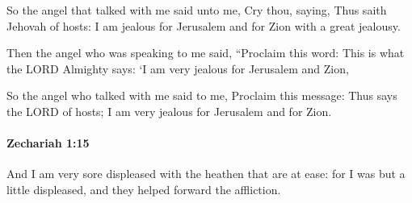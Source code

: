 			\begin{versebox}
					\item[BHS] 
					\item[LXX] 
					\item[ASV] So the angel that talked with me said unto me, Cry thou, saying, Thus saith Jehovah of hosts: I am jealous for Jerusalem and for Zion with a great jealousy.
					\item[NIV] Then the angel who was speaking to me said, “Proclaim this word: This is what the LORD Almighty says: ‘I am very jealous for Jerusalem and Zion,
					\item[NRSV] So the angel who talked with me said to me, Proclaim this message: Thus says the LORD of hosts; I am very jealous for Jerusalem and for Zion.
			\end{versebox}

		\paragraph{Zechariah 1:15} %
			\label{ZECHARIAH-1-15}

			And I am very sore displeased with the heathen that are at ease: for I was but a little displeased, and they helped forward the affliction.

